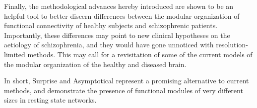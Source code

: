 Finally, the methodological advances hereby introduced are shown to be an helpful tool to better discern differences between the modular organization of functional connectivity of healthy subjects and schizophrenic patients.
Importantly, these differences may point to new clinical hypotheses on the aetiology of schizophrenia, and they would have gone unnoticed with resolution-limited methods.
This may call for a revisitation of some of the current models of the modular organization of the healthy and diseased brain.

In short, Surprise and Asymptotical represent a promising alternative to current methods, and demonstrate the presence of functional modules of very different sizes in resting state networks.